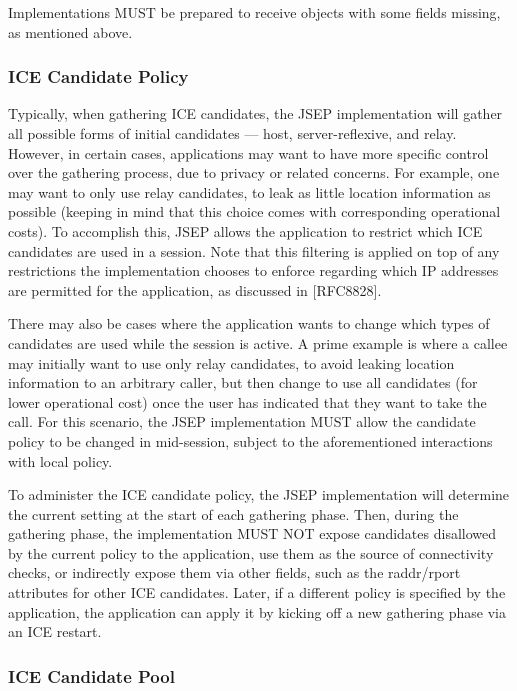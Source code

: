 \documentclass{article}
\begin{document}
Implementations MUST be prepared to receive objects with some fields
missing, as mentioned above.

\subsubsection{ICE Candidate Policy}

Typically, when gathering ICE candidates, the JSEP implementation
will gather all possible forms of initial candidates --- host, server-reflexive,
and relay.  However, in certain cases, applications may
want to have more specific control over the gathering process, due to
privacy or related concerns.  For example, one may want to only use
relay candidates, to leak as little location information as possible
(keeping in mind that this choice comes with corresponding
operational costs).  To accomplish this, JSEP allows the application
to restrict which ICE candidates are used in a session.  Note that
this filtering is applied on top of any restrictions the
implementation chooses to enforce regarding which IP addresses are
permitted for the application, as discussed in [RFC8828].

There may also be cases where the application wants to change which
types of candidates are used while the session is active.  A prime
example is where a callee may initially want to use only relay
candidates, to avoid leaking location information to an arbitrary
caller, but then change to use all candidates (for lower operational
cost) once the user has indicated that they want to take the call.
For this scenario, the JSEP implementation MUST allow the candidate
policy to be changed in mid-session, subject to the aforementioned
interactions with local policy.

To administer the ICE candidate policy, the JSEP implementation will
determine the current setting at the start of each gathering phase.
Then, during the gathering phase, the implementation MUST NOT expose
candidates disallowed by the current policy to the application, use
them as the source of connectivity checks, or indirectly expose them
via other fields, such as the raddr/rport attributes for other ICE
candidates.  Later, if a different policy is specified by the
application, the application can apply it by kicking off a new
gathering phase via an ICE restart.

\subsubsection{ICE Candidate Pool}
\end{document}
